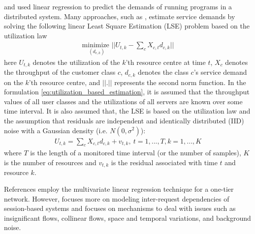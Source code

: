 \cite{rolia_parameter_1995} and \cite{rolia_correlating_1998} used linear regression to predict the demands of running programs in a distributed system. Many approaches, such as \cite{pacifici_cpu_2008}, estimate service demands by solving the following linear Least Square Estimation (LSE) problem based on the utilization law %
  \begin{align}     \label{eq:utilization_based_estimation}
    \underset{(d_{c,k})} {\text{minimize } }   ||U_{t,k} -  \sum_{c} X_{c,t}  d_{c,k}||   
  \end{align} 
  here $U_{t,k}$ denotes the utilization of the $k$'th resource centre at time $t$, $X_c$ denotes the throughput of the customer class $c$, $d_{c,k}$ denotes the class $c$'s service demand on the $k$'th resource centre, and $||.||$  represents the second norm function. In the formulation \ref{eq:utilization_based_estimation}, it is assumed that the throughput values of all user classes and the utilizations of all servers are known over some time interval. It is also assumed that, the
  LSE is based on the utilization law and the assumption that residuals are independent and identically distributed (IID) noise with a Gaussian density (i.e. $N(0, \sigma^2)$): 
 \begin{align}
 U_{t,k} = \sum_{c} X_{c,t}  d_{c,k} + v_{t,k},\   t=1,...,T , k=1,...,K 
  \end{align}
 where $T$ is the length of a monitored time interval (or the number of samples), $K$ is the number of resources and $v_{t,k}$ is the residual associated with time $t$ and resource $k$.   

 References \cite{pacifici_cpu_2008,zhang_regression-based_2007} employ the multivariate linear regression technique for a one-tier network. However, \cite{zhang_regression-based_2007} focuses more on modeling inter-request dependencies of session-based systems and \cite{pacifici_cpu_2008} focuses on mechanisms to deal with issues such as insignificant flows, collinear flows, space and temporal variations, and background noise. 
 
